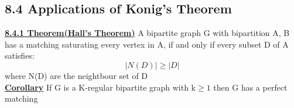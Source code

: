 \documentclass[12pt]{article}
\newcommand{\myt}[1]{\textbf{\underline{#1}}}
\begin{document}
	\subsection*{8.4 Applications of Konig's Theorem}
	\myt{8.4.1 Theorem(Hall's Theorem)} A bipartite graph G with bipartition A, B has a matching saturating every vertex in A, if and only if every subset D of A satisfies:\\
	$$|N(D)| \geq |D|$$
	where N(D) are the neightbour set of D\\
	
	\myt{Corollary} If G is a K-regular bipartite graph with k$\geq 1$ then G has a perfect matching\\
	
	

	
\end{document}
